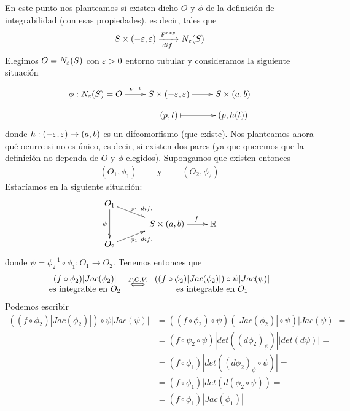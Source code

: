 En este punto nos planteamos si existen dicho $O$ y $\phi$ de la definición de integrabilidad (con esas propiedades), es decir, tales que 
\begin{gather*}
    S \times (-\varepsilon, \varepsilon) \xrightarrow[dif.]{F^{exp}} N_\varepsilon(S)
\end{gather*}
Elegimos $O=N_\varepsilon(S)$ con $\varepsilon>0$ entorno tubular y consideramos la siguiente situación
\begin{gather*}
    \xymatrix@R=3mm {
        \phi : N_\veps(S) = O \ar[r]^{\ \ F^{-1}} & S\times (-\veps, \veps) \ar[r] & S\times(a,b)\\
        & (p,t) \ar@{|->}[r] & (p,h(t))
    }
\end{gather*}
donde $h:(-\varepsilon, \varepsilon) \to (a,b)$ es un difeomorfismo (que existe). Nos planteamos ahora qué ocurre si no es único, es decir, si existen dos pares (ya que queremos que la definición no dependa de $O$ y $\phi$ elegidos). Supongamos que existen entonces
\begin{gather*}
    (O_1, \phi_1) \qquad \text{ y } \qquad (O_2, \phi_2)
\end{gather*}
Estaríamos en la siguiente situación:
\begin{gather*}
    \xymatrix@R=3mm{
        O_1 \ar[dr]^{\phi_1\ dif.} \ar[dd]_{\psi}\\
        & \quad S\times(a,b) \ar[r]^{\qquad f} & \bb{R}\\
        O_2 \ar[ur]_{\phi_1\ dif.}
    }
\end{gather*}
donde $\psi = \phi_2^{-1}\circ \phi_1: O_1 \to O_2$. Tenemos entonces que 
\begin{gather*}
    \begin{array}{c}
        (f \circ \phi_2)|Jac(\phi_2)|\\
        \text{es integrable en $O_2$}
    \end{array}
    \overset{T.C.V.}{\iff}
    \begin{array}{c}
        ((f\circ \phi_2)|Jac(\phi_2)|) \circ \psi |Jac(\psi)|\\
        \text{es integrable en $O_1$}
    \end{array}
\end{gather*}
Podemos escribir
\begin{align*}
    ((f\circ \phi_2)|Jac(\phi_2)|) \circ \psi |Jac(\psi)| &= 
    ((f\circ \phi_2)\circ \psi)(|Jac(\phi_2)| \circ \psi)|Jac(\psi)| = \\
    &=
    (f\circ \psi_2 \circ \psi) |det((d\phi_2)_\psi)||det(d\psi)| = \\
    &=
    (f \circ \phi_1)|det((d\phi_2)_\psi \circ \psi)| = \\
    &=
    (f\circ \phi_1)|det(d(\phi_2 \circ \psi)) =\\
    &=
    (f\circ \phi_1)|Jac(\phi_1)|
\end{align*}
